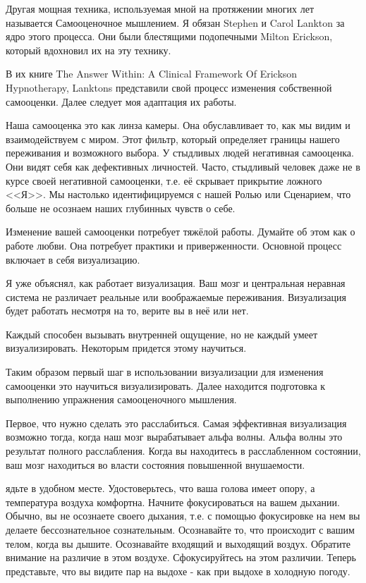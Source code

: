 \documentclass[10pt, fleqn]{article}
\begin{document}

Другая мощная техника, используемая мной на протяжении многих лет называется Самооценочное мышлением. Я обязан Stephen и Carol Lankton за ядро этого процесса. Они были блестящими подопечными Milton Erickson, который вдохновил их на эту технику.

В их книге The Answer Within: A Clinical Framework Of Erickson
Hypnotherapy, Lanktons представили свой процесс изменения собственной самооценки. Далее следует моя адаптация их работы.

Наша самооценка это как линза камеры. Она обуславливает то, как мы видим и взаимодействуем с миром. Этот фильтр, который определяет границы нашего переживания и возможного выбора. У стыдливых людей негативная самооценка. Они видят себя как дефективных личностей. Часто, стыдливый человек даже не в курсе своей негативной самооценки, т.е. её скрывает прикрытие ложного <<Я>>. Мы настолько идентифицируемся с нашей Ролью или Сценарием, что больше не осознаем наших глубинных чувств о себе.

Изменение вашей самооценки потребует тяжёлой работы. Думайте об этом как о работе любви. Она потребует практики и приверженности. Основной процесс включает в себя визуализацию.

Я уже объяснял, как работает визуализация. Ваш мозг и центральная неравная система не различает реальные или воображаемые переживания. Визуализация будет работать несмотря на то, верите вы в неё или нет.

Каждый способен вызывать внутренней ощущение, но не каждый умеет визуализировать. Некоторым придется этому научиться.

Таким образом первый шаг в использовании визуализации для изменения самооценки это научиться визуализировать. Далее находится подготовка к выполнению упражнения самооценочного мышления.


Первое, что нужно сделать это расслабиться. Самая эффективная визуализация возможно тогда, когда наш мозг вырабатывает альфа волны. Альфа волны это результат полного расслабления. Когда вы находитесь в расслабленном состоянии, ваш мозг находиться во власти состояния повышенной внушаемости.


ядьте в удобном месте. Удостоверьтесь, что ваша голова имеет опору, а температура воздуха комфортна. Начните фокусироваться на вашем дыхании. Обычно, вы не осознаете своего дыхания, т.е. с помощью фокусировке на нем вы делаете бессознательное сознательным. Осознавайте то, что происходит с вашим телом, когда вы дышите. Осознавайте входящий и выходящий воздух. Обратите внимание на различие в этом воздухе. Сфокусируйтесь на этом различии. Теперь представьте, что вы видите пар на выдохе - как при выдохе в холодную погоду.
\end{document}
